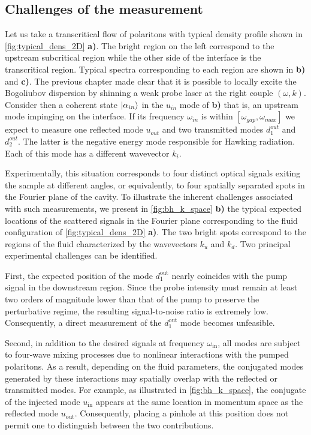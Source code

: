 \subsection{Challenges of the measurement}


Let us take a transcritical flow of polaritons with typical density profile shown in \autoref{fig:typical_dens_2D} \textbf{a)}. The bright
region on the left correspond to the upstream subcritical region while the other side of the interface is the transcritical region. Typical spectra corresponding to each region are shown in \textbf{b)} and \textbf{c)}.
The previous chapter made clear that it is possible to locally excite the Bogoliubov dispersion by shinning a weak probe laser at the right couple $(\omega, k)$. Consider then a coherent state
$\ket{\alpha_{in}}$ in the $u_{in}$ mode of \textbf{b)} that is, an upstream mode impinging on the interface. If its frequency $\omega_{in}$ is within $[\omega_{gap}, \omega_{max}]$ we expect to measure one reflected mode $u_{out}$ and two transmitted modes $d_1^{out}$ and $d_2^{out}$. The latter is the negative
energy mode responsible for Hawking radiation. Each of this mode has a different wavevector $k_i$.

\bigskip


Experimentally, this situation corresponds to four distinct optical signals exiting the sample at different angles, or equivalently, to four spatially separated spots in the Fourier plane of the cavity. To illustrate the inherent challenges associated with such measurements, we present in \autoref{fig:bh_k_space} \textbf{b)} the typical expected locations of the scattered signals in the Fourier plane corresponding to the fluid configuration of \autoref{fig:typical_dens_2D} \textbf{a)}. The two bright spots correspond to the regions of the fluid characterized by the wavevectors \(k_u\) and \(k_d\). Two principal experimental challenges can be identified. 

First, the expected position of the mode \(d_1^{\text{out}}\) nearly coincides with the pump signal in the downstream region. Since the probe intensity must remain at least two orders of magnitude lower than that of the pump to preserve the perturbative regime, the resulting signal-to-noise ratio is extremely low. Consequently, a direct measurement of the \(d_1^{\text{out}}\) mode becomes unfeasible.

Second, in addition to the desired signals at frequency \(\omega_{\text{in}}\), all modes are subject to four-wave mixing processes due to nonlinear interactions with the pumped polaritons. As a result, depending on the fluid parameters, the conjugated modes generated by these interactions may spatially overlap with the reflected or transmitted modes. For example, as illustrated in \autoref{fig:bh_k_space}, the conjugate of the injected mode \(u_{\text{in}}\) appears at the same location in momentum space as the reflected mode \(u_{\text{out}}\). Consequently, placing a pinhole at this position does not permit one to distinguish between the two contributions.

